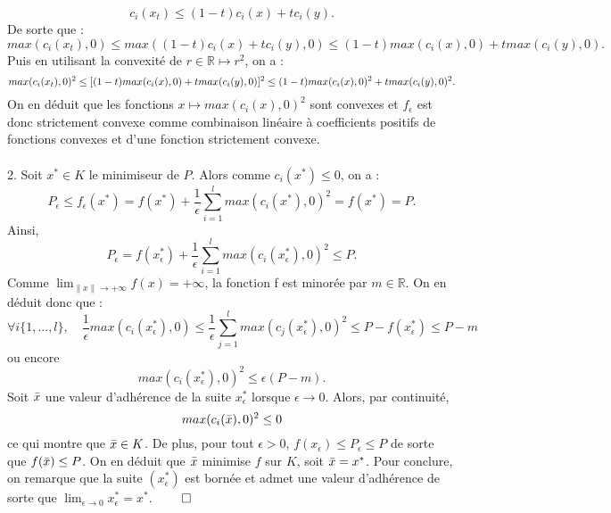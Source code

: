 \documentclass[12pt]{article}
\newcommand{\R}{\mathbb{R}}
\begin{document}
\[
c_i(x_t) \leq (1-t)c_i(x) + tc_i(y).
\]
De sorte que :
\[
max(c_i(x_t),0) \leq max((1-t)c_i(x) + tc_i(y),0) \leq (1-t)max(c_i(x),0) + tmax(c_i(y),0).
\]
Puis en utilisant la convexité de $r \in \R \mapsto r^2$, on a : \[
max(c_i(x_t),0)^2 \leq [(1-t)max(c_i(x),0) + tmax(c_i(y),0)]^2\\
\leq (1-t)max(c_i(x),0)^2 + tmax(c_i(y),0)^2.
\]
On en déduit que les fonctions $x \mapsto max(c_i(x),0)^2$ sont convexes et $f_\epsilon$ est donc strictement convexe comme combinaison linéaire à coefficients positifs de fonctions convexes et d'une fonction strictement convexe.\\
\\
2. Soit $x^* \in K$ le minimiseur de $P$. Alors comme $c_i(x^*) \leq 0$, on a :
\[
P_\epsilon \leq f_\epsilon(x^*) = f(x^*) + \frac{1}{\epsilon} \sum^{l}_{i = 1}max(c_i(x^*),0)^2 = f(x^*) = P.
\]
Ainsi, 
\[
P_\epsilon = f(x_\epsilon^*) + \frac{1}{\epsilon} \sum^{l}_{i = 1}max(c_i(x_\epsilon^*),0)^2
\leq P.\]
Comme $\lim_{\lVert x\lVert \to +\infty} f(x) = +\infty$, la fonction f est minorée par $m \in \R$. On en déduit donc que :
\[
\forall i \{1,...,l\}, \quad \frac{1}{\epsilon}max(c_i(x^*_\epsilon),0) \leq \frac{1}{\epsilon} \sum^{l}_{j = 1}max(c_j(x_\epsilon^*),0)^2 \leq P - f(x^*_\epsilon) \leq P - m 
\]
ou encore 
\[
max(c_i(x^*_\epsilon),0)^2 \leq \epsilon(P-m).
\]
Soit $\Bar{x}$ une valeur d'adhérence de la suite $x^*_\epsilon$ lorsque $\epsilon \to 0$. Alors, par continuité,
\[
max(c_i(\Bar{x}),0)^2 \leq 0
\]
ce qui montre que $\Bar{x} \in K$. De plus, pour tout $\epsilon > 0$, $f(x_\epsilon) \leq P_\epsilon \leq P$ de sorte que $f(\Bar{x}) \leq P$. On en déduit que $\Bar{x}$ minimise $f$ sur $K$, soit $\Bar{x} = x^*$. Pour conclure, on remarque que la suite $(x^*_\epsilon)$ est bornée et admet une valeur d'adhérence de sorte que $\lim_{\epsilon \to 0} x^*_\epsilon = x^*$. $\qed$
\end{document}
